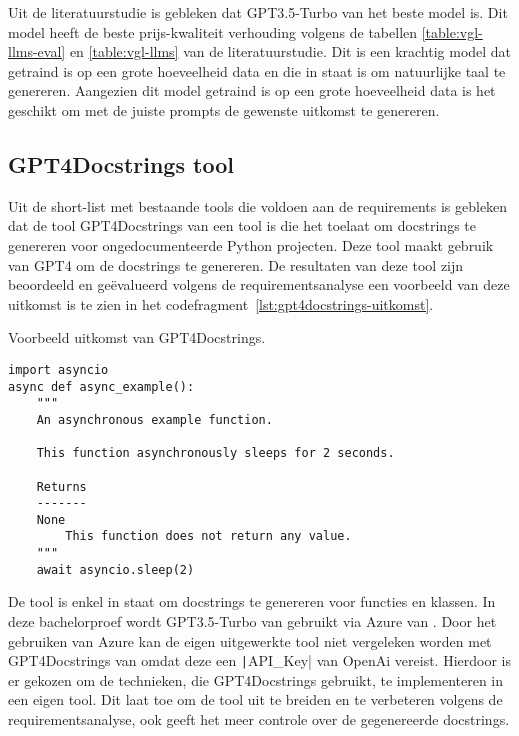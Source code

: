 Uit de literatuurstudie is gebleken dat GPT3.5-Turbo van \textcite{OpenAi2024} het beste model is. 
Dit model heeft de beste prijs-kwaliteit verhouding volgens de tabellen \ref{table:vgl-llms-eval} en \ref{table:vgl-llms} van de literatuurstudie.
Dit is een krachtig model dat getraind is op een grote hoeveelheid data en die in staat is om natuurlijke taal te genereren.
Aangezien dit model getraind is op een grote hoeveelheid data is het geschikt om met de juiste prompts de gewenste uitkomst te genereren.


\subsection{GPT4Docstrings tool}
\label{sec:bestanddocumentatie-tool}
Uit de short-list met bestaande tools die voldoen aan de requirements is gebleken dat de tool GPT4Docstrings van \textcite{Trofficus2023} een tool is die het toelaat om docstrings te genereren voor ongedocumenteerde Python projecten.
Deze tool maakt gebruik van GPT4 \autocite{OpenAI2023} om de docstrings te genereren.
De resultaten van deze tool zijn beoordeeld en geëvalueerd volgens de requirementsanalyse een voorbeeld van deze uitkomst is te zien in het codefragment~\ref{lst:gpt4docstrings-uitkomst}.

\begin{listing}
    \caption{Voorbeeld uitkomst van GPT4Docstrings. \autocite{Trofficus2023}}
    \label{lst:gpt4docstrings-uitkomst}
    \begin{verbatim}
import asyncio
async def async_example():
    """
    An asynchronous example function.

    This function asynchronously sleeps for 2 seconds.

    Returns
    -------
    None
        This function does not return any value.
    """
    await asyncio.sleep(2)
    \end{verbatim}
\end{listing}

De tool is enkel in staat om docstrings te genereren voor functies en klassen.
In deze bachelorproef wordt GPT3.5-Turbo van \textcite{OpenAi2024} gebruikt via Azure van \textcite{Microsoft2024}.
Door het gebruiken van Azure kan de eigen uitgewerkte tool niet vergeleken worden met GPT4Docstrings van \textcite{Trofficus2023} omdat deze een \texttt|API_Key| van OpenAi \autocite{OpenAi2024} vereist.
Hierdoor is er gekozen om de technieken, die GPT4Docstrings gebruikt, te implementeren in een eigen tool.
Dit laat toe om de tool uit te breiden en te verbeteren volgens de requirementsanalyse, ook geeft het meer controle over de gegenereerde docstrings.

